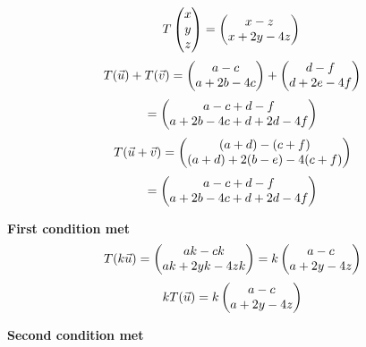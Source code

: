 \documentclass{article}
\begin{document}
\begin{minipage}[c]{.5\linewidth}
\[
T
\left(\begin{array}{@{}c@{}}
	x \\
	y \\
	z
\end{array}\right) = 
\left(\begin{array}{@{}c@{}}
	x -z\\
	x + 2y - 4z\\
\end{array}\right) 
\\
\]
\[
T(\vec u) + T(\vec v) = 
\left(\begin{array}{@{}c@{}}
	a-c \\
	a + 2b - 4c \\
\end{array}\right)+
\left(\begin{array}{@{}c@{}}
	d-f \\
	d + 2e - 4f \\
\end{array}\right)
\]	
\[=
\left(\begin{array}{@{}c@{}}
	a-c+d-f \\
	a + 2b - 4c + d + 2d - 4f \\
\end{array}\right)
\]
\[
T(\vec u + \vec v) = 
\left(\begin{array}{@{}c@{}}
	(a+d) - (c+f) \\
	(a+d) + 2(b-e)-4(c+f)\\
\end{array}\right)
\]
\[
=
\left(\begin{array}{@{}c@{}}
	a-c+d-f \\
	a + 2b - 4c + d + 2d - 4f \\
\end{array}\right)
\]
 \par\noindent \textbf{First condition met}
\[
T(k \vec u) = 
\left(\begin{array}{@{}c@{}}
	ak - ck \\
	ak + 2yk - 4zk \\
\end{array}\right)=
k
\left(\begin{array}{@{}c@{}}
	a - c \\
	a + 2y - 4z \\
\end{array}\right)
\]
\[
kT(\vec u) = k
\left(\begin{array}{@{}c@{}}
	a - c \\
	a + 2y - 4z \\
\end{array}\right)
\]
\par\noindent \textbf{Second condition met}	
	
\end{minipage}
\end{document}

